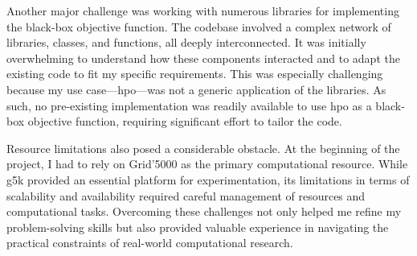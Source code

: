 Another major challenge was working with numerous libraries for implementing the black-box objective function. The codebase involved a complex network of libraries, classes, and functions, all deeply interconnected. It was initially overwhelming to understand how these components interacted and to adapt the existing code to fit my specific requirements. This was especially challenging because my use case—\acrlong{hpo}—was not a generic application of the libraries. As such, no pre-existing implementation was readily available to use \acrshort{hpo} as a black-box objective function, requiring significant effort to tailor the code.

Resource limitations also posed a considerable obstacle. At the beginning of the project, I had to rely on Grid'5000 as the primary computational resource. While g5k provided an essential platform for experimentation, its limitations in terms of scalability and availability required careful management of resources and computational tasks. Overcoming these challenges not only helped me refine my problem-solving skills but also provided valuable experience in navigating the practical constraints of real-world computational research.

